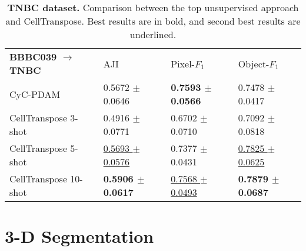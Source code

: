 \setlength{\tabcolsep}{4pt}
\begin{table}
\begin{center}
\caption{\textbf{TNBC dataset.} Comparison between the top unsupervised approach and CellTranspose. Best results are in bold, and second best results are underlined.}
\label{table:tnbc}
\begin{adjustbox}{width=\columnwidth}
\begin{tabular}{l|l|l|l}
\hline\noalign{\smallskip}
{\textbf{BBBC039 $\rightarrow$ TNBC}} & AJI & Pixel-$F_1$ & Object-$F_1$ \\
\noalign{\smallskip}
\hline
\noalign{\smallskip}
CyC-PDAM~\cite{Liu2020-qh}						& 0.5672 $\pm$ 0.0646
												& \textbf{0.7593 $\pm$ 0.0566}
												& 0.7478 $\pm$ 0.0417 \\
CellTranspose 3-shot 						& 0.4916 $\pm$ 0.0771
												& 0.6702 $\pm$ 0.0710
												& 0.7092 $\pm$ 0.0818 \\
CellTranspose 5-shot 						& \underline{0.5693 $\pm$ 0.0576} 
												& 0.7377 $\pm$ 0.0431
												& \underline{0.7825 $\pm$ 0.0625} \\
CellTranspose 10-shot						& \textbf{0.5906 $\pm$ 0.0617}
												& \underline{0.7568 $\pm$ 0.0493} 
												& \textbf{0.7879 $\pm$ 0.0687} \\
\hline
\end{tabular}
\end{adjustbox}
\end{center}
\vspace{-5mm}
\end{table}
\setlength{\tabcolsep}{1.4pt}





\section{3-D Segmentation} \label{3D_results}


